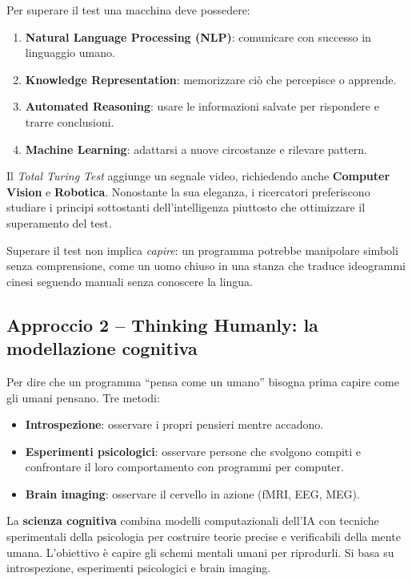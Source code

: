 Per superare il test una macchina deve possedere:
\begin{enumerate}
    \item \textbf{Natural Language Processing (NLP)}: comunicare con successo in linguaggio umano.
    \item \textbf{Knowledge Representation}: memorizzare ci\`o che percepisce o apprende.
    \item \textbf{Automated Reasoning}: usare le informazioni salvate per rispondere e trarre conclusioni.
    \item \textbf{Machine Learning}: adattarsi a nuove circostanze e rilevare pattern.
\end{enumerate}

Il \emph{Total Turing Test} aggiunge un segnale video, richiedendo anche \textbf{Computer Vision} e \textbf{Robotica}. Nonostante la sua eleganza, i ricercatori preferiscono studiare i principi sottostanti dell'intelligenza piuttosto che ottimizzare il superamento del test.

\begin{notebox}
Superare il test non implica \emph{capire}: un programma potrebbe manipolare simboli senza comprensione, come un uomo chiuso in una stanza che traduce ideogrammi cinesi seguendo manuali senza conoscere la lingua.
\end{notebox}


\subsection{Approccio 2 -- Thinking Humanly: la modellazione cognitiva}
Per dire che un programma ``pensa come un umano'' bisogna prima capire come gli umani pensano. Tre metodi:
\begin{itemize}
    \item \textbf{Introspezione}: osservare i propri pensieri mentre accadono.
    \item \textbf{Esperimenti psicologici}: osservare persone che svolgono compiti e confrontare il loro comportamento con programmi per computer.
    \item \textbf{Brain imaging}: osservare il cervello in azione (fMRI, EEG, MEG).
\end{itemize}

La \textbf{scienza cognitiva} combina modelli computazionali dell'IA con tecniche sperimentali della psicologia per costruire teorie precise e verificabili della mente umana.
L'obiettivo è capire gli schemi mentali umani per riprodurli. Si basa su introspezione, esperimenti psicologici e brain imaging.


